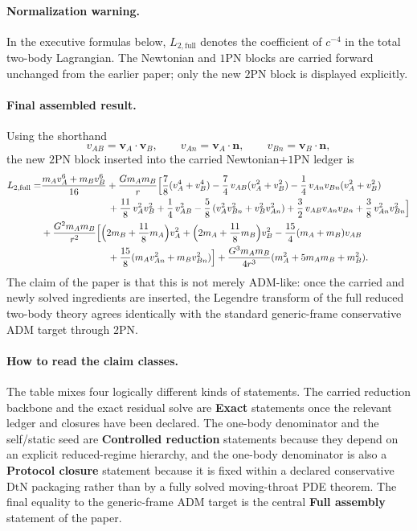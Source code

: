 \documentclass[11pt]{article}
\newcommand{\vct}{\mathbf v}
\newcommand{\nvec}{\mathbf n}
\newcommand{\OnePN}{\mathrm{1PN}}
\newcommand{\TwoPN}{\mathrm{2PN}}
\newcommand{\ADM}{\mathrm{ADM}}
\newcommand{\DtN}{\mathrm{DtN}}
\newcommand{\Exact}{\textbf{Exact}}
\newcommand{\Controlled}{\textbf{Controlled reduction}}
\newcommand{\Protocol}{\textbf{Protocol closure}}
\newcommand{\FullMatch}{\textbf{Full assembly}}
\begin{document}
\paragraph{Normalization warning.}
In the executive formulas below, $L_{2,\text{full}}$ denotes the coefficient of $c^{-4}$ in the total two-body Lagrangian. The Newtonian and $\OnePN$ blocks are carried forward unchanged from the earlier paper; only the new $\TwoPN$ block is displayed explicitly.

\paragraph{Final assembled result.}
Using the shorthand
\[
v_{AB}=\vct_A\!\cdot\!\vct_B,
\qquad
v_{An}=\vct_A\!\cdot\!\nvec,
\qquad
v_{Bn}=\vct_B\!\cdot\!\nvec,
\]
the new $\TwoPN$ block inserted into the carried Newtonian+$\OnePN$ ledger is
\begin{align}
L_{2,\text{full}}=
&\frac{m_A v_A^6+m_B v_B^6}{16}
+\frac{Gm_A m_B}{r}\Big[
\frac78(v_A^4+v_B^4)
-\frac74\,v_{AB}(v_A^2+v_B^2)
-\frac14\,v_{An}v_{Bn}(v_A^2+v_B^2) \notag\\
&\hspace{7em}
+\frac{11}{8}\,v_A^2v_B^2
+\frac14\,v_{AB}^2
-\frac58\,(v_A^2v_{Bn}^2+v_B^2v_{An}^2)
+\frac32\,v_{AB}v_{An}v_{Bn}
+\frac38\,v_{An}^2v_{Bn}^2
\Big] \notag\\
&+\frac{G^2m_A m_B}{r^2}\Big[
\Big(2m_B+\frac{11}{8}m_A\Big)v_A^2
+\Big(2m_A+\frac{11}{8}m_B\Big)v_B^2
-\frac{15}{4}(m_A+m_B)v_{AB} \notag\\
&\hspace{7em}
+\frac{15}{8}(m_A v_{An}^2+m_B v_{Bn}^2)
\Big]
+\frac{G^3m_A m_B}{4r^3}(m_A^2+5m_A m_B+m_B^2).
\label{eq:exec-2pn-block}
\end{align}
The claim of the paper is that this is not merely $\ADM$-like: once the carried and newly solved ingredients are inserted, the Legendre transform of the full reduced two-body theory agrees identically with the standard generic-frame conservative $\ADM$ target through $\TwoPN$.

\paragraph{How to read the claim classes.}
The table mixes four logically different kinds of statements. The carried reduction backbone and the exact residual solve are {\Exact} statements once the relevant ledger and closures have been declared. The one-body denominator and the self/static seed are {\Controlled} statements because they depend on an explicit reduced-regime hierarchy, and the one-body denominator is also a {\Protocol} statement because it is fixed within a declared conservative $\DtN$ packaging rather than by a fully solved moving-throat PDE theorem. The final equality to the generic-frame $\ADM$ target is the central {\FullMatch} statement of the paper.
\end{document}
